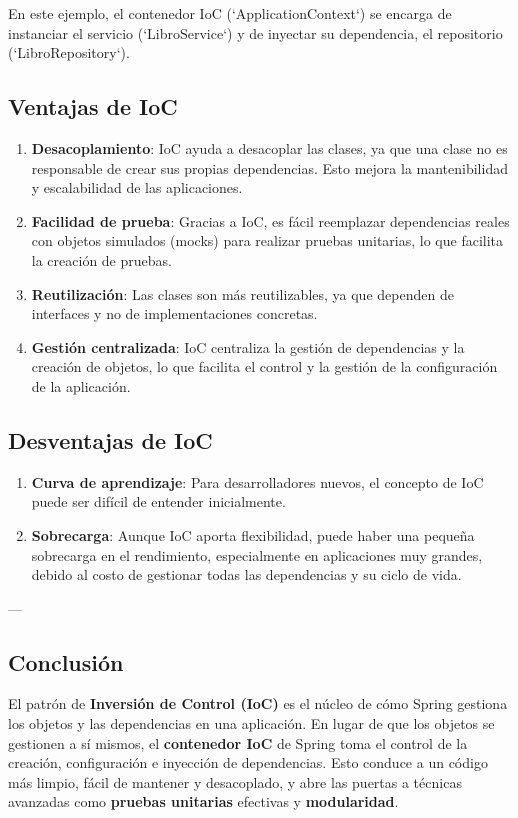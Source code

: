 \documentclass[11pt]{article}
\begin{document}
En este ejemplo, el contenedor IoC (`ApplicationContext`) se encarga de instanciar el servicio (`LibroService`) y de inyectar su dependencia, el repositorio (`LibroRepository`).

\subsection{Ventajas de IoC}
\label{sec:org4b1b489}
\begin{enumerate}
\item \textbf{\textbf{Desacoplamiento}}: IoC ayuda a desacoplar las clases, ya que una clase no es responsable de crear sus propias dependencias. Esto mejora la mantenibilidad y escalabilidad de las aplicaciones.

\item \textbf{\textbf{Facilidad de prueba}}: Gracias a IoC, es fácil reemplazar dependencias reales con objetos simulados (mocks) para realizar pruebas unitarias, lo que facilita la creación de pruebas.

\item \textbf{\textbf{Reutilización}}: Las clases son más reutilizables, ya que dependen de interfaces y no de implementaciones concretas.

\item \textbf{\textbf{Gestión centralizada}}: IoC centraliza la gestión de dependencias y la creación de objetos, lo que facilita el control y la gestión de la configuración de la aplicación.
\end{enumerate}

\subsection{Desventajas de IoC}
\label{sec:org9c9b546}
\begin{enumerate}
\item \textbf{\textbf{Curva de aprendizaje}}: Para desarrolladores nuevos, el concepto de IoC puede ser difícil de entender inicialmente.

\item \textbf{\textbf{Sobrecarga}}: Aunque IoC aporta flexibilidad, puede haber una pequeña sobrecarga en el rendimiento, especialmente en aplicaciones muy grandes, debido al costo de gestionar todas las dependencias y su ciclo de vida.
\end{enumerate}

---

\subsection{Conclusión}
\label{sec:org70530bb}
El patrón de \textbf{\textbf{Inversión de Control (IoC)}} es el núcleo de cómo Spring gestiona los objetos y las dependencias en una aplicación. En lugar de que los objetos se gestionen a sí mismos, el \textbf{\textbf{contenedor IoC}} de Spring toma el control de la creación, configuración e inyección de dependencias. Esto conduce a un código más limpio, fácil de mantener y desacoplado, y abre las puertas a técnicas avanzadas como \textbf{\textbf{pruebas unitarias}} efectivas y \textbf{\textbf{modularidad}}.
\end{document}
